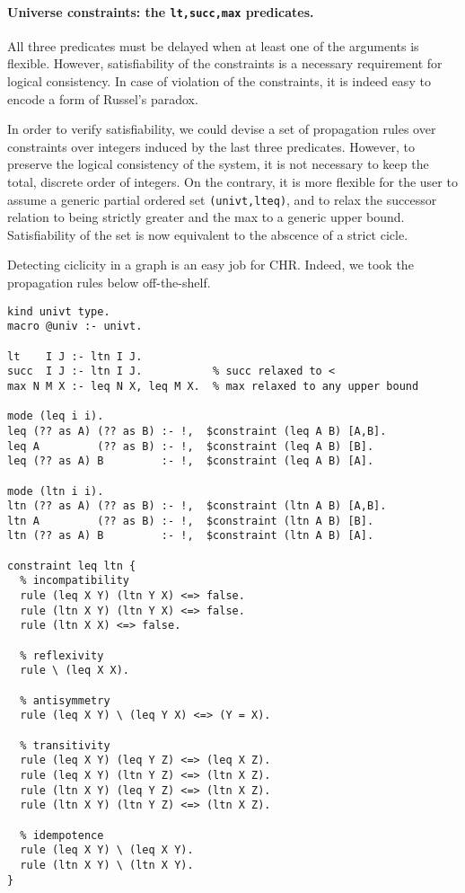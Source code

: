 \documentclass{easychair}
\begin{document}
\paragraph{Universe constraints: the \texttt{lt,succ,max} predicates.}
All three predicates must be delayed when at least one of the arguments is flexible. However, satisfiability of the constraints is a necessary requirement for logical consistency. In case of violation of the constraints, it is indeed easy to encode a form of Russel's paradox.

In order to verify satisfiability, we could devise a set of propagation rules
over constraints over integers induced by the last three predicates. However, to preserve the logical consistency of the system, it is not necessary to keep the total, discrete order of integers. On the contrary, it is more flexible for the user to assume a generic partial ordered set \verb+(univt,lteq)+, and to relax the successor relation to being strictly greater and the max to a generic upper bound. Satisfiability of the set is now equivalent to the abscence of a strict cicle.

Detecting ciclicity in a graph is an easy job for CHR. Indeed, we took the propagation rules below off-the-shelf.

\begin{verbatim}
kind univt type.
macro @univ :- univt.

lt    I J :- ltn I J.
succ  I J :- ltn I J.           % succ relaxed to <
max N M X :- leq N X, leq M X.  % max relaxed to any upper bound

mode (leq i i).
leq (?? as A) (?? as B) :- !,  $constraint (leq A B) [A,B].
leq A         (?? as B) :- !,  $constraint (leq A B) [B].
leq (?? as A) B         :- !,  $constraint (leq A B) [A].

mode (ltn i i).
ltn (?? as A) (?? as B) :- !,  $constraint (ltn A B) [A,B].
ltn A         (?? as B) :- !,  $constraint (ltn A B) [B].
ltn (?? as A) B         :- !,  $constraint (ltn A B) [A].

constraint leq ltn {
  % incompatibility
  rule (leq X Y) (ltn Y X) <=> false.
  rule (ltn X Y) (ltn Y X) <=> false.
  rule (ltn X X) <=> false.
  
  % reflexivity
  rule \ (leq X X).

  % antisymmetry
  rule (leq X Y) \ (leq Y X) <=> (Y = X).

  % transitivity
  rule (leq X Y) (leq Y Z) <=> (leq X Z).
  rule (leq X Y) (ltn Y Z) <=> (ltn X Z).
  rule (ltn X Y) (leq Y Z) <=> (ltn X Z).
  rule (ltn X Y) (ltn Y Z) <=> (ltn X Z).

  % idempotence
  rule (leq X Y) \ (leq X Y).
  rule (ltn X Y) \ (ltn X Y).
}
\end{verbatim}
\end{document}

